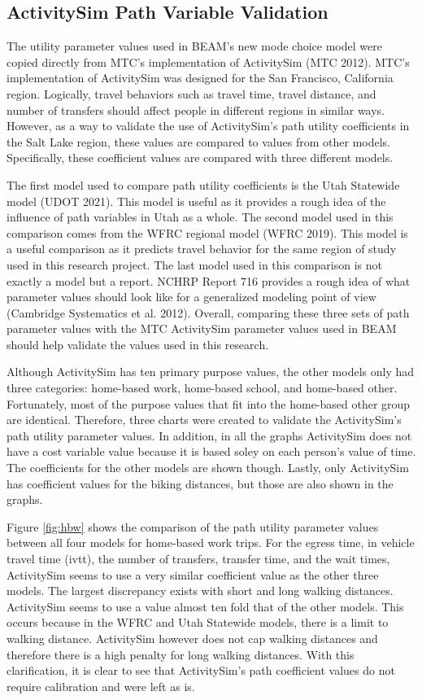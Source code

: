 \documentclass[12pt, oneside, openright]{byuthesis}
\begin{document}
\hypertarget{valid}{%
\subsection{ActivitySim Path Variable Validation}\label{valid}}

The utility parameter values used in BEAM's new mode choice model were copied directly from MTC's implementation of ActivitySim (MTC 2012). MTC's implementation of ActivitySim was designed for the San Francisco, California region. Logically, travel behaviors such as travel time, travel distance, and number of transfers should affect people in different regions in similar ways. However, as a way to validate the use of ActivitySim's path utility coefficients in the Salt Lake region, these values are compared to values from other models. Specifically, these coefficient values are compared with three different models.

The first model used to compare path utility coefficients is the Utah Statewide model (UDOT 2021). This model is useful as it provides a rough idea of the influence of path variables in Utah as a whole. The second model used in this comparison comes from the WFRC regional model (WFRC 2019). This model is a useful comparison as it predicts travel behavior for the same region of study used in this research project. The last model used in this comparison is not exactly a model but a report. NCHRP Report 716 provides a rough idea of what parameter values should look like for a generalized modeling point of view (Cambridge Systematics et al. 2012). Overall, comparing these three sets of path parameter values with the MTC ActivitySim parameter values used in BEAM should help validate the values used in this research.

Although ActivitySim has ten primary purpose values, the other models only had three categories: home-based work, home-based school, and home-based other. Fortunately, most of the purpose values that fit into the home-based other group are identical. Therefore, three charts were created to validate the ActivitySim's path utility parameter values. In addition, in all the graphs ActivitySim does not have a cost variable value because it is based soley on each person's value of time. The coefficients for the other models are shown though. Lastly, only ActivitySim has coefficient values for the biking distances, but those are also shown in the graphs.

Figure \ref{fig:hbw} shows the comparison of the path utility parameter values between all four models for home-based work trips. For the egress time, in vehicle travel time (ivtt), the number of transfers, transfer time, and the wait times, ActivitySim seems to use a very similar coefficient value as the other three models. The largest discrepancy exists with short and long walking distances. ActivitySim seems to use a value almost ten fold that of the other models. This occurs because in the WFRC and Utah Statewide models, there is a limit to walking distance. ActivitySim however does not cap walking distances and therefore there is a high penalty for long walking distances. With this clarification, it is clear to see that ActivitySim's path coefficient values do not require calibration and were left as is.
\end{document}

